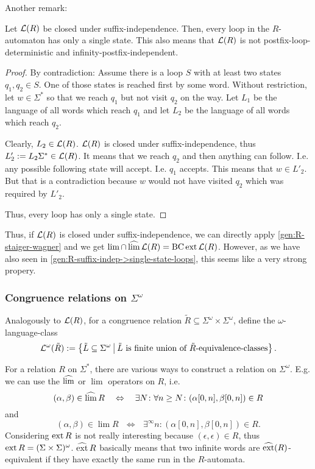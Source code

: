 Another remark:
\begin{lemma}
\label{gen:R-suffix-indep->single-state-loops}
Let $\mathcal{L}(R)$ be closed under suffix-independence. Then, every loop in the $R$-automaton has only a single state. This also means that $\mathcal{L}(R)$ is not postfix-loop-deterministic and infinity-postfix-independent.
\begin{proof}
By contradiction: Assume there is a loop $S$ with at least two states $q_1,q_2 \in S$. One of those states is reached first by some word. Without restriction, let $w \in \Sigma^*$ so that we reach $q_1$ but not visit $q_2$ on the way. Let $L_1$ be the language of all words which reach $q_1$ and let $L_2$ be the language of all words which reach $q_2$.

Clearly, $L_2 \in \mathcal{L}(R)$. $\mathcal{L}(R)$ is closed under suffix-independence, thus $L'_2 := L_2 \Sigma^* \in \mathcal{L}(R)$. It means that we reach $q_2$ and then anything can follow. I.e. any possible following state will accept. I.e. $q_1$ accepts. This means that $w \in L'_2$. But that is a contradiction because $w$ would not have visited $q_2$ which was required by $L'_2$.

Thus, every loop has only a single state.
\end{proof}
\end{lemma}

Thus, if $\mathcal{L}(R)$ is closed under suffix-independence, we can directly apply \cref{gen:R-staiger-wagner} and we get $\lim \cap \operatorname{\widehat{lim}} \mathcal{L}(R) = \operatorname{BC} \operatorname{ext} \mathcal{L}(R)$. However, as we have also seen in \cref{gen:R-suffix-indep->single-state-loops}, this seems like a very strong propery.


\subsubsection{Congruence relations on $\Sigma^\omega$}

\begin{mydef}
Analogously to $\mathcal{L}(R)$, for a congruence relation $\tilde R \subseteq \Sigma^\omega \times \Sigma^\omega$, define the $\omega$-language-class
\[ \Lang^\omega(\tilde R) := \Set{\tilde L \subseteq \Sigma^\omega}{\text{$\tilde L$ is finite union of $\tilde R$-equivalence-classes}} . \]
\end{mydef}

For a relation $R$ on $\Sigma^*$, there are various ways to construct a relation on $\Sigma^\omega$. E.g. we can use the $\operatorname{\widehat{lim}}$ or $\lim$ operators on $R$, i.e.
\[ (\alpha,\beta) \in \dlim R \ \ \ \Leftrightarrow \ \ \ \exists N \colon \forall n \ge N \colon (\alpha[0,n],\beta[0,n]) \in R \]
and
\[ (\alpha,\beta) \in \lim R \ \ \ \Leftrightarrow \ \ \ \exists^\infty n \colon (\alpha[0,n],\beta[0,n]) \in R . \]
Considering $\operatorname{ext} R$ is not really interesting because $(\epsilon,\epsilon) \in R$, thus $\operatorname{ext} R = (\Sigma \times \Sigma)^\omega$. $\operatorname{\widehat{ext}} R$ basically means that two infinite words are $\operatorname{\widehat{ext}}(R)$-equivalent if they have exactly the same run in the $R$-automata.

